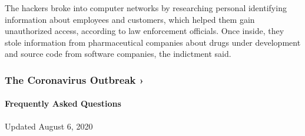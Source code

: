 The hackers broke into computer networks by researching personal
identifying information about employees and customers, which helped them
gain unauthorized access, according to law enforcement officials. Once
inside, they stole information from pharmaceutical companies about drugs
under development and source code from software companies, the
indictment said.

\href{https://www.nytimes.com/news-event/coronavirus?action=click\&pgtype=Article\&state=default\&region=MAIN_CONTENT_3\&context=storylines_faq}{}

\hypertarget{the-coronavirus-outbreak-}{%
\subsubsection{The Coronavirus Outbreak
›}\label{the-coronavirus-outbreak-}}

\hypertarget{frequently-asked-questions}{%
\paragraph{Frequently Asked
Questions}\label{frequently-asked-questions}}

Updated August 6, 2020

